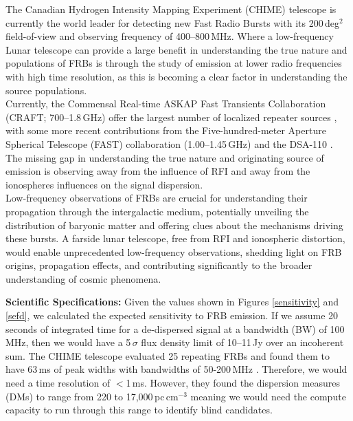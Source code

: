 The Canadian Hydrogen Intensity Mapping Experiment (CHIME) telescope is currently the world leader for detecting new Fast Radio Bursts with its 200\,deg$^{2}$ field-of-view and observing frequency of 400--800\,MHz. %
Where a low-frequency Lunar telescope can provide a large benefit in understanding the true nature and populations of FRBs is through the study of emission at lower radio frequencies with high time resolution, as this is becoming a clear factor in understanding the source populations. \\ 

Currently, the Commensal Real-time ASKAP Fast Transients Collaboration (CRAFT; 700--1.8\,GHz) offer the largest number of localized repeater sources \citep{SM_2023}, with some more recent contributions from the Five-hundred-meter Aperture Spherical Telescope (FAST) collaboration (1.00--1.45\,GHz\citep{ZX_2023}) and the DSA-110 \citep{SD_2023,LC_2023}. The missing gap in understanding the true nature and originating source of emission is observing away from the influence of RFI and away from the ionospheres influences on the signal dispersion. \\ 

Low-frequency observations of FRBs are crucial for understanding their propagation through the intergalactic medium, potentially unveiling the distribution of baryonic matter and offering clues about the mechanisms driving these bursts. A farside lunar telescope, free from RFI and ionospheric distortion, would enable unprecedented low-frequency observations, shedding light on FRB origins, propagation effects, and contributing significantly to the broader understanding of cosmic phenomena.

\textbf{Scientific Specifications:} Given the values shown in Figures \ref{sensitivity} and \ref{sefd}, we calculated the expected sensitivity to FRB emission. If we assume 20\,seconds of integrated time for a de-dispersed signal at a bandwidth (BW) of 100\,MHz, then we would have a 5\,$\sigma$ flux density limit of 10--11\,Jy over an incoherent sum. The CHIME telescope evaluated 25 repeating FRBs and found them to have 63\,ms of peak widths with bandwidths of 50-200\,MHz \citep{CHIME_RepeatingFRB}. Therefore, we would need a time resolution of $<$1\,ms. However, they found the dispersion measures (DMs) to range from 220 to 17,000\,pc\,cm$^{-3}$ meaning we would need the compute capacity to run through this range to identify blind candidates. 

